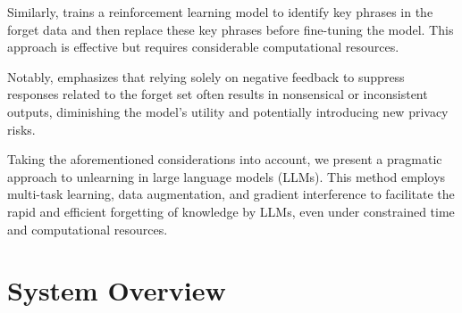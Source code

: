 \documentclass[11pt]{article}
\begin{document}
Similarly, \citet{eldan2023s} trains a reinforcement learning model to identify key phrases in the forget data and then replace these key phrases before fine-tuning the model. This approach is effective but requires considerable computational resources.


Notably, \citet{mekala2024alternate} emphasizes that relying solely on negative feedback to suppress responses related to the forget set often results in nonsensical or inconsistent outputs, diminishing the model's utility and potentially introducing new privacy risks.


Taking the aforementioned considerations into account, we present a pragmatic approach to unlearning in large language models (LLMs). This method employs multi-task learning, data augmentation, and gradient interference to facilitate the rapid and efficient forgetting of knowledge by LLMs, even under constrained time and computational resources.

\section{System Overview}


\end{document}

